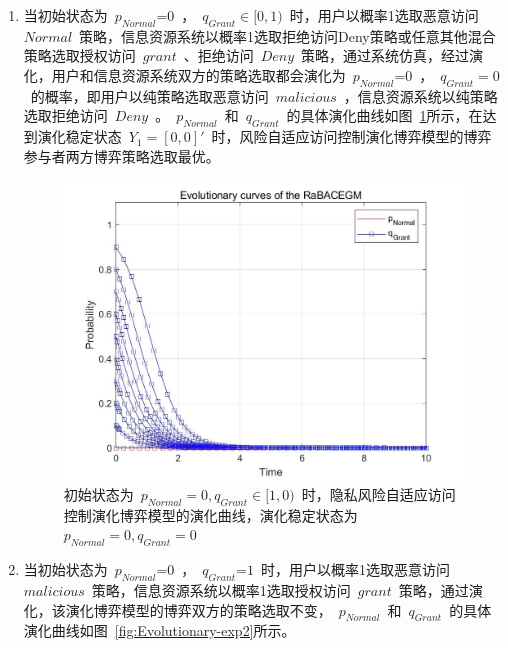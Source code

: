 \begin{enumerate}
 	\item 当初始状态为~${{p}_{Normal}}\text{=0}$~，~${{q}_{Grant}}\in [0,1)$~时，用户以概率1选取恶意访问~$Normal$~策略，信息资源系统以概率1选取拒绝访问Deny策略或任意其他混合策略选取授权访问~$grant$~、拒绝访问~$Deny$~策略，通过系统仿真，经过演化，用户和信息资源系统双方的策略选取都会演化为~${{p}_{Normal}}\text{=0}$~，~${{q}_{Grant}}=0$~的概率，即用户以纯策略选取恶意访问~$malicious$~，信息资源系统以纯策略选取拒绝访问~$Deny$~。~${{p}_{Normal}}$~和~${{q}_{Grant}}$~的具体演化曲线如图~\ref{fig:Evolutionary-exp1}所示，在达到演化稳定状态~${{Y}_{1}}=[0,0]'$~时，风险自适应访问控制演化博弈模型的博弈参与者两方博弈策略选取最优。
 	
 	 \begin{figure}[htbp]
 		\centering
 		\includegraphics[width=0.8\linewidth]{./figures/Evolutionary-exp1.jpg}
 		\centering
 		\caption{初始状态为~$p_{Normal}=0,q_{Grant}∈[1,0)$~时，隐私风险自适应访问控制演化博弈模型的演化曲线，演化稳定状态为~$p_{Normal}=0, q_{Grant}=0$~}\label{fig:Evolutionary-exp1}
 	\end{figure}
 
 	\item 当初始状态为~${{p}_{Normal}}\text{=0}$~，~${{q}_{Grant}}\text{=}1$~时，用户以概率1选取恶意访问~$malicious$~策略，信息资源系统以概率1选取授权访问~$grant$~策略，通过演化，该演化博弈模型的博弈双方的策略选取不变，~${{p}_{Normal}}$~和~${{q}_{Grant}}$~的具体演化曲线如图~\ref{fig:Evolutionary-exp2}所示。
 	

\end{enumerate}
